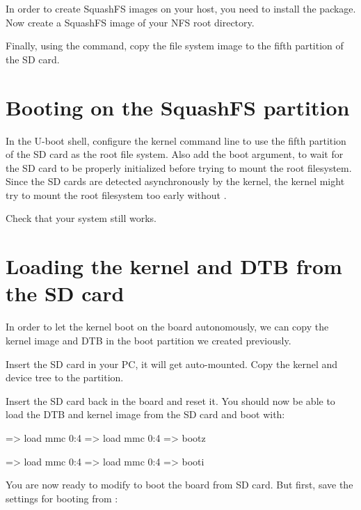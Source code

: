 In order to create SquashFS images on your host, you need to install
the  package. Now create a SquashFS image of your
NFS root directory.

Finally, using the  command, copy the file system image to
the fifth partition of the SD card.

\section{Booting on the SquashFS partition}

In the U-boot shell, configure the kernel command line to use the
fifth partition of the SD card as the root file system. Also add the
 boot argument, to wait for the SD card to be properly
initialized before trying to mount the root filesystem. Since the SD
cards are detected asynchronously by the kernel, the kernel might try
to mount the root filesystem too early without .

Check that your system still works.

\section{Loading the kernel and DTB from the SD card}

In order to let the kernel boot on the board autonomously, we can
copy the kernel image and DTB in the boot partition we created
previously.

Insert the SD card in your PC, it will get auto-mounted. Copy the
kernel and device tree to the  partition.

Insert the SD card back in the board and reset it. You should now be
able to load the DTB and kernel image from the SD card and boot with:
\if{}
\begin{ubootinput}
=> load mmc 0:4 %
=> load mmc 0:4 %
=> bootz %
\end{ubootinput}
\fi
\if{}
\begin{ubootinput}
=> load mmc 0:4 %
=> load mmc 0:4 %
=> booti %
\end{ubootinput}
\fi

You are now ready to modify  to boot the board
from SD card. But first, save the settings for booting from
:

